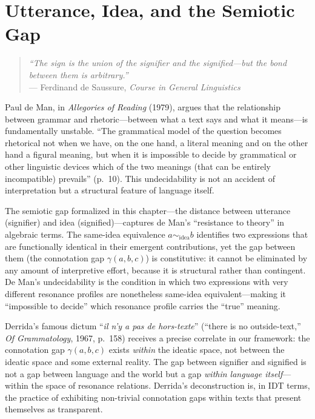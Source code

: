 
\chapter{Utterance, Idea, and the Semiotic Gap}

\begin{quote}
\textit{``The sign is the union of the signifier and the signified---but
the bond between them is arbitrary.''}\\
\hfill --- Ferdinand de Saussure, \textit{Course in General Linguistics}
\end{quote}

\begin{interpretation}\label{interp:ch6:de_man_gap}
Paul de Man, in \emph{Allegories of Reading} (1979), argues that the
relationship between grammar and rhetoric---between what a text says and
what it means---is fundamentally unstable. ``The grammatical model of the
question becomes rhetorical not when we have, on the one hand, a literal
meaning and on the other hand a figural meaning, but when it is impossible
to decide by grammatical or other linguistic devices which of the two
meanings (that can be entirely incompatible) prevails'' (p.~10). This
undecidability is not an accident of interpretation but a structural
feature of language itself.

The semiotic gap formalized in this chapter---the distance between
utterance (signifier) and idea (signified)---captures de Man's
``resistance to theory'' in algebraic terms. The same-idea equivalence
$a \sim_{\text{idea}} b$ identifies two expressions that are functionally
identical in their emergent contributions, yet the gap between them (the
connotation gap $\gamma(a, b, c)$) is constitutive: it cannot be
eliminated by any amount of interpretive effort, because it is
structural rather than contingent. De Man's undecidability is the
condition in which two expressions with very different resonance profiles
are nonetheless same-idea equivalent---making it ``impossible to decide''
which resonance profile carries the ``true'' meaning.

Derrida's famous dictum ``\emph{il n'y a pas de hors-texte}'' (``there is
no outside-text,'' \emph{Of Grammatology}, 1967, p.~158) receives a
precise correlate in our framework: the connotation gap $\gamma(a, b, c)$
exists \emph{within} the ideatic space, not between the ideatic space and
some external reality. The gap between signifier and signified is not a gap
between language and the world but a gap \emph{within language itself}---
within the space of resonance relations. Derrida's deconstruction is,
in IDT terms, the practice of exhibiting non-trivial connotation gaps
within texts that present themselves as transparent.
\end{interpretation}

